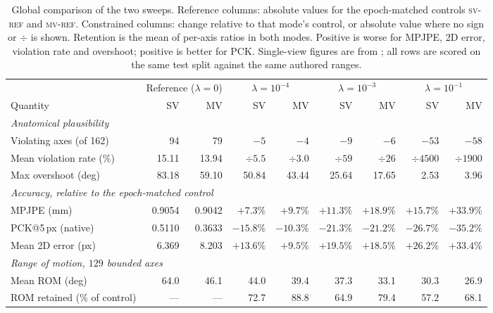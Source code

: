 \documentclass[11pt,a4paper]{article}
\newcommand{\lam}{\lambda}
\newcommand{\armref}{\textsc{mv-ref}}
\newcommand{\svref}{\textsc{sv-ref}}
\begin{document}
\begin{table}[t]
\centering
\small
\setlength{\tabcolsep}{2.2pt}
\caption{Global comparison of the two sweeps. Reference columns: absolute
values for the epoch-matched controls \svref{} and \armref{}. Constrained
columns: change relative to that mode's control, or absolute value where no
sign or $\div$ is shown. Retention is the mean of per-axis ratios in both
modes. Positive is worse for MPJPE, 2D error, violation rate and
overshoot; positive is better for PCK. Single-view figures are from \cite{sv};
all rows are scored on the same test split against the same authored ranges.}
\label{tab:global}
\begin{tabular}{l rr rr rr rr}
\toprule
 & \multicolumn{2}{c}{Reference ($\lam = 0$)}
 & \multicolumn{2}{c}{$\lam = 10^{-4}$}
 & \multicolumn{2}{c}{$\lam = 10^{-3}$}
 & \multicolumn{2}{c}{$\lam = 10^{-1}$} \\
\cmidrule(lr){2-3}\cmidrule(lr){4-5}\cmidrule(lr){6-7}\cmidrule(lr){8-9}
Quantity & SV & MV & SV & MV & SV & MV & SV & MV \\
\midrule
\multicolumn{9}{l}{\emph{Anatomical plausibility}}\\
Violating axes (of 162)      & 94 & 79 & $-5$ & $-4$ & $-9$ & $-6$ & $-53$ & $-58$ \\
Mean violation rate (\%)     & 15.11 & 13.94 & $\div 5.5$ & $\div 3.0$ & $\div 59$ & $\div 26$ & $\div 4500$ & $\div 1900$ \\
Max overshoot (deg)          & 83.18 & 59.10 & 50.84 & 43.44 & 25.64 & 17.65 & 2.53 & 3.96 \\
\midrule
\multicolumn{9}{l}{\emph{Accuracy, relative to the epoch-matched control}}\\
MPJPE (mm)                   & 0.9054 & 0.9042 & $+7.3\%$ & $+9.7\%$ & $+11.3\%$ & $+18.9\%$ & $+15.7\%$ & $+33.9\%$ \\
PCK@5\,px (native)           & 0.5110 & 0.3633 & $-15.8\%$ & $-10.3\%$ & $-21.3\%$ & $-21.2\%$ & $-26.7\%$ & $-35.2\%$ \\
Mean 2D error (px)           & 6.369 & 8.203 & $+13.6\%$ & $+9.5\%$ & $+19.5\%$ & $+18.5\%$ & $+26.2\%$ & $+33.4\%$ \\
\midrule
\multicolumn{9}{l}{\emph{Range of motion, $129$ bounded axes}}\\
Mean ROM (deg)               & 64.0 & 46.1 & 44.0 & 39.4 & 37.3 & 33.1 & 30.3 & 26.9 \\
ROM retained (\% of control) & --- & --- & 72.7 & 88.8 & 64.9 & 79.4 & 57.2 & 68.1 \\

\end{tabular}
\end{table}
\end{document}
